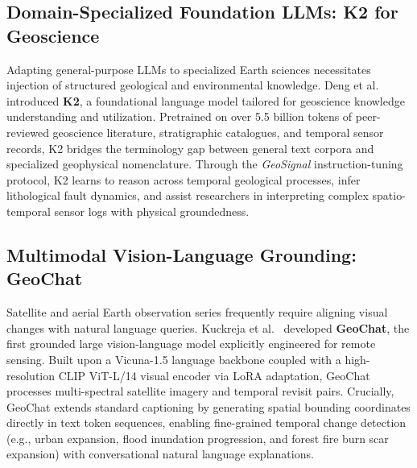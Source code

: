 \subsection{Domain-Specialized Foundation LLMs: K2 for Geoscience}
Adapting general-purpose LLMs to specialized Earth sciences necessitates injection of structured geological and environmental knowledge. Deng et al.~\cite{deng2024k2} introduced \textbf{K2}, a foundational language model tailored for geoscience knowledge understanding and utilization. Pretrained on over 5.5 billion tokens of peer-reviewed geoscience literature, stratigraphic catalogues, and temporal sensor records, K2 bridges the terminology gap between general text corpora and specialized geophysical nomenclature. Through the \textit{GeoSignal} instruction-tuning protocol, K2 learns to reason across temporal geological processes, infer lithological fault dynamics, and assist researchers in interpreting complex spatio-temporal sensor logs with physical groundedness.

\subsection{Multimodal Vision-Language Grounding: GeoChat}
Satellite and aerial Earth observation series frequently require aligning visual changes with natural language queries. Kuckreja et al.~\cite{kuckreja2024geochat} developed \textbf{GeoChat}, the first grounded large vision-language model explicitly engineered for remote sensing. Built upon a Vicuna-1.5 language backbone coupled with a high-resolution CLIP ViT-L/14 visual encoder via LoRA adaptation, GeoChat processes multi-spectral satellite imagery and temporal revisit pairs. Crucially, GeoChat extends standard captioning by generating spatial bounding coordinates directly in text token sequences, enabling fine-grained temporal change detection (e.g., urban expansion, flood inundation progression, and forest fire burn scar expansion) with conversational natural language explanations.

